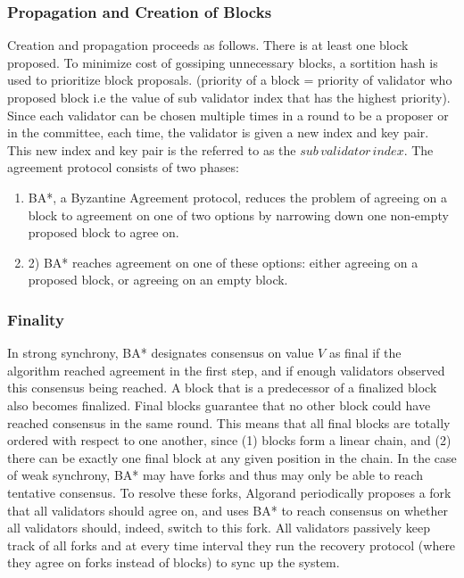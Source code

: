 \documentclass[10pt,journal,compsoc]{IEEEtran}
\begin{document}
\subsubsection{Propagation and Creation of Blocks}
Creation and propagation proceeds as follows. There is at least one block proposed. To minimize cost of gossiping unnecessary blocks, a sortition hash is used to prioritize block proposals. (priority of a block = priority of validator who proposed block i.e the value of sub validator index that has the highest priority). Since each validator can be chosen multiple times in a round to be a proposer or in the committee, each time, the validator is given a new index and key pair. This new index and key pair is the referred to as the $sub\,validator \,index$.
The agreement protocol consists of two phases: 
\begin{enumerate}
    \item BA*, a Byzantine Agreement protocol, reduces the problem of agreeing on a block to agreement on one of two options by narrowing down one non-empty proposed block to agree on.
    \item 2) BA* reaches agreement on one of these options: either agreeing on a proposed block, or agreeing on an empty block. 
\end{enumerate}


\subsubsection{Finality}
In strong synchrony, BA* designates consensus on value $V$ as final if the algorithm reached agreement in the first step, and if enough validators observed this consensus being reached. A block that is a predecessor of a finalized block also becomes finalized. Final blocks guarantee that no other block could have reached consensus in the same round. This means that all final blocks are totally ordered with respect to one another, since (1) blocks form a linear chain, and (2) there can be exactly one final block at any given position in the chain. In the case of weak synchrony, BA* may have forks and thus may only be able to reach tentative consensus. To resolve these forks, Algorand periodically proposes a fork that all validators should agree on, and uses BA* to reach consensus on whether all validators should, indeed, switch to this fork. All validators passively keep track of all forks and at every time interval they run the recovery protocol (where they agree on forks instead of blocks) to sync up the system.
\end{document}
